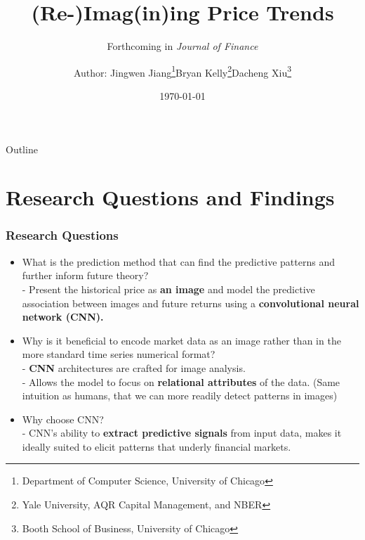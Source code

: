 \documentclass{beamer}
\title[Read Papers]{(Re-)Imag(in)ing Price Trends}
\subtitle{Forthcoming in \textit{Journal of Finance}}
\author[Zhiming]{
    Author:  Jingwen Jiang\footnote{Department of Computer Science, University of Chicago}\quad Bryan Kelly\footnote{Yale University, AQR Capital Management, and NBER}\quad Dacheng Xiu\footnote{Booth School of Business, University of Chicago}
    \vspace{0.1in}
    }
\date{\today}
\begin{document}
\frame[plain]{\maketitle}

\begin{frame}{Outline}
    \label{outline}
    \tableofcontents{}
\end{frame}

\section{Research Questions and Findings}
\begin{frame}
\frametitle{Research Questions}
\begin{itemize}
    \item What is the prediction method that can find the predictive patterns and further inform future theory?\\
    - Present the historical price as \textbf{an image} and model the predictive association between images and future returns using a \textbf{convolutional neural network (CNN).}
    \item Why is it beneficial to encode market data as an image rather than in the more standard time series numerical format?\\
    - \textbf{CNN} architectures are crafted for image analysis.\\
    - Allows the model to focus on \textbf{relational attributes} of the data. (Same intuition as humans, that we can more readily detect patterns in images)\\
    \item Why choose CNN?\\
    - CNN's ability to \textbf{extract predictive signals} from input data, makes it ideally suited to elicit patterns that underly financial markets.
\end{itemize}

\end{frame}
\end{document}

